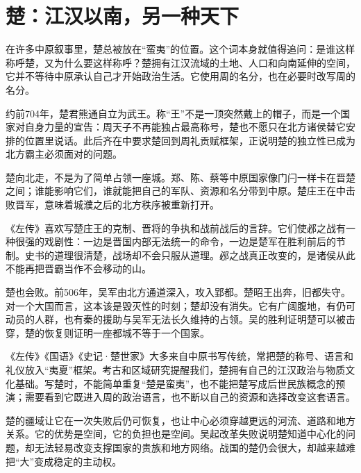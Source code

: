 \section{楚：江汉以南，另一种天下}

在许多中原叙事里，楚总被放在“蛮夷”的位置。这个词本身就值得追问：是谁这样称呼楚，又为什么要这样称呼？楚拥有江汉流域的土地、人口和向南延伸的空间，它并不等待中原承认自己才开始政治生活。它使用周的名分，也在必要时改写周的名分。


约前704年，楚君熊通自立为武王。称“王”不是一顶突然戴上的帽子，而是一个国家对自身力量的宣告：周天子不再能独占最高称号，楚也不愿只在北方诸侯替它安排的位置里说话。此后齐在中要求楚回到周礼贡赋框架，正说明楚的独立性已成为北方霸主必须面对的问题。

楚向北走，不是为了简单占领一座城。郑、陈、蔡等中原国家像门闩一样卡在晋楚之间；谁能影响它们，谁就能把自己的军队、资源和名分带到中原。楚庄王在中击败晋军，意味着城濮之后的北方秩序被重新打开。

《左传》喜欢写楚庄王的克制、晋将的争执和战前战后的言辞。它们使邲之战有一种很强的戏剧性：一边是晋国内部无法统一的命令，一边是楚军在胜利前后的节制。史书的道理很清楚，战场却不会只服从道理。邲之战真正改变的，是诸侯从此不能再把晋霸当作不会移动的山。

楚也会败。前506年，吴军由北方通道深入，攻入郢都。楚昭王出奔，旧都失守。对一个大国而言，这本该是毁灭性的时刻；楚却没有消失。它有广阔腹地，有仍可动员的人群，也有秦的援助与吴军无法长久维持的占领。吴的胜利证明楚可以被击穿，楚的恢复则证明一座都城不等于一个国家。

\begin{sourcenote}[楚怎样被书写]
《左传》《国语》《史记·楚世家》大多来自中原书写传统，常把楚的称号、语言和礼仪放入“夷夏”框架。考古和区域研究提醒我们，楚拥有自己的江汉政治与物质文化基础。写楚时，不能简单重复“楚是蛮夷”，也不能把楚写成后世民族概念的预演；需要看到它既进入周的政治语言，也不断以自己的资源和选择改变这套语言。
\end{sourcenote}

\begin{turningpoint}
楚的疆域让它在一次失败后仍可恢复，也让中心必须穿越更远的河流、道路和地方关系。它的优势是空间，它的负担也是空间。吴起改革失败说明楚知道中心化的问题，却无法轻易改变支撑国家的贵族和地方网络。战国的楚仍会很大，却越来越难把“大”变成稳定的主动权。
\end{turningpoint}
